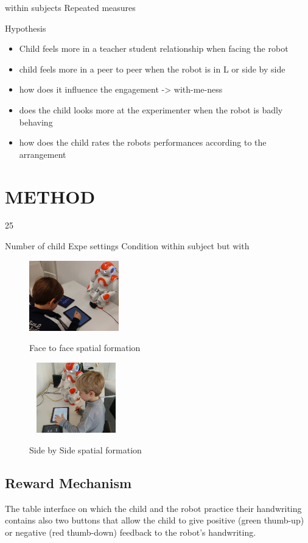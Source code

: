 \documentclass[letterpaper, 10 pt, conference]{ieeeconf}  %
\begin{document}
within subjects Repeated measures 


Hypothesis
\begin{itemize}
\item Child feels more in a teacher student relationship when facing the robot
\item child feels more in a peer to peer when the robot is in L or side by side 
\item how does it influence the engagement -> with-me-ness
\item  does the child looks more at the experimenter when the robot is badly behaving
\item how does the child rates the robots performances according to  the arrangement
\end{itemize}


\section{METHOD}
25

Number of child
Expe settings
Condition within subject but with 
\begin{figure}[t!]
    \centering
        \includegraphics[height=1.2in]{./figures/f2f_photo.png}
        \caption{Face to face spatial formation}
   ~
        \includegraphics[height=1.2in]{./figures/s2s_photo2.jpg}
        \caption{Side by Side spatial formation}
\end{figure}


\subsection{Reward Mechanism}
The table interface on which the child and the robot practice their handwriting contains also two buttons that allow the child to give positive (green thumb-up) or negative (red thumb-down) feedback to the robot's handwriting.
\end{document}
